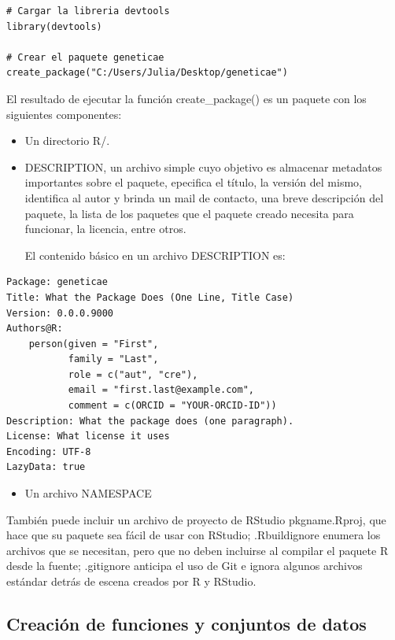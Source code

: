 \begin{lstlisting}
# Cargar la libreria devtools
library(devtools)

# Crear el paquete geneticae
create_package("C:/Users/Julia/Desktop/geneticae")
\end{lstlisting}


El resultado de ejecutar la función create\_package() es un paquete con los siguientes componentes:
\begin{itemize}
\item Un directorio R/.
\end{itemize}
\begin{itemize}
\item DESCRIPTION, un archivo simple cuyo objetivo es almacenar metadatos importantes sobre el paquete, epecifica el título, la versión del mismo, identifica al autor y brinda un mail de contacto, una breve descripción del paquete, la lista de los paquetes que el paquete creado necesita para funcionar, la licencia, entre otros.

El contenido básico en un archivo DESCRIPTION es:
\end{itemize}

\begin{verbatim}
Package: geneticae
Title: What the Package Does (One Line, Title Case)
Version: 0.0.0.9000
Authors@R: 
    person(given = "First",
           family = "Last",
           role = c("aut", "cre"),
           email = "first.last@example.com",
           comment = c(ORCID = "YOUR-ORCID-ID"))
Description: What the package does (one paragraph).
License: What license it uses
Encoding: UTF-8
LazyData: true
\end{verbatim}




\begin{itemize}
\item Un archivo NAMESPACE
\end{itemize}

También puede incluir un archivo de proyecto de RStudio pkgname.Rproj, que hace que su paquete sea fácil de usar con RStudio; .Rbuildignore enumera los archivos que se necesitan, pero que no deben incluirse al compilar el paquete R desde la fuente; .gitignore anticipa el uso de Git e ignora algunos archivos estándar detrás de escena creados por R y RStudio.

\subsection{Creación de funciones y conjuntos de datos}

